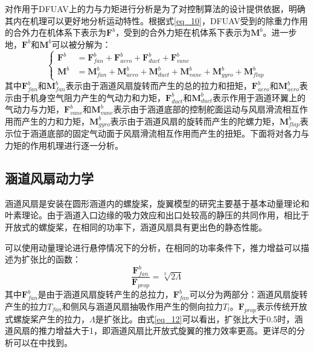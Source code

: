 对作用于DFUAV上的力与力矩进行分析是为了对控制算法的设计提供依据，明确其内在机理可以更好地分析运动特性。根据式\eqref{eq_10}，DFUAV受到的除重力作用的合外力在机体系下表示为$\boldsymbol{F}^b$，受到的合外力矩在机体系下表示为$\boldsymbol{M}^b$。进一步地，$\boldsymbol{F}^b$和$\boldsymbol{M}^b$可以被分解为：
\begin{equation}
    \left\{
    \begin{aligned}
        \boldsymbol{F}^b&=\boldsymbol{F}_{fan}^b+\boldsymbol{F}_{aero}^b+\boldsymbol{F}_{duct}^b+\boldsymbol{F}_{vane}^b \\
        \boldsymbol{M}^b&=\boldsymbol{M}_{fan}^b+\boldsymbol{M}_{aero}^b+\boldsymbol{M}_{duct}^b+\boldsymbol{M}_{vane}^b+\boldsymbol{M}_{gyro}^b+\boldsymbol{M}_{flap}^b
    \end{aligned}
\right.
\label{eq_11}
\end{equation}
其中$\boldsymbol{F}_{fan}^b$和$\boldsymbol{M}_{fan}^b$表示由于涵道风扇旋转而产生的总的拉力和扭矩，$\boldsymbol{F}_{aero}^b$和$\boldsymbol{M}_{aero}^b$表示由于机身空气阻力产生的气动力和力矩，$\boldsymbol{F}_{duct}^b$和$\boldsymbol{M}_{duct}^b$表示作用于涵道环翼上的气动力与力矩，$\boldsymbol{F}_{vane}^b$和$\boldsymbol{M}_{vane}^b$表示由于涵道底部的控制舵面运动与风扇滑流相互作用而产生的力和力矩，$\boldsymbol{M}_{gyro}^b$表示由于涵道风扇的旋转而产生的陀螺力矩，$\boldsymbol{M}_{flap}^b$表示位于涵道底部的固定气动面于风扇滑流相互作用而产生的扭矩。下面将对各力与力矩的作用机理进行逐一分析。

\subsection{涵道风扇动力学}

涵道风扇是安装在圆形涵道内的螺旋桨，旋翼模型的研究主要基于基本动量理论和叶素理论。由于涵道入口边缘的吸力效应和出口处较高的静压的共同作用，相比于开放式的螺旋桨，在相同的功率下，涵道风扇具有更出色的静态性能。

可以使用动量理论进行悬停情况下的分析，在相同的功率条件下，推力增益可以描述为扩张比的函数：
\begin{equation}
    \dfrac{\boldsymbol{F}_{fan}^b}{\boldsymbol{F}_{prop}}={\sqrt[3]{2\Lambda}}
    \label{eq_12}
\end{equation}
其中$\boldsymbol{F}_{fan}^b$是由于涵道风扇旋转产生的总拉力，$\boldsymbol{F}_{fan}^b$可以分为两部分：涵道风扇旋转产生的拉力$T_{fan}$和侧风与涵道风扇抽吸作用产生的侧向拉力$T_{l}$。$\boldsymbol{F}_{prop}$表示传统开放式螺旋桨产生的拉力，$\Lambda$是扩张比。由式\eqref{eq_12}可以看出，扩张比大于0.5时，涵道风扇的推力增益大于1，即涵道风扇比开放式旋翼的推力效率更高。更详尽的分析可以在\parencite{pereiraHoverWindtunnelTesting2008}中找到。

